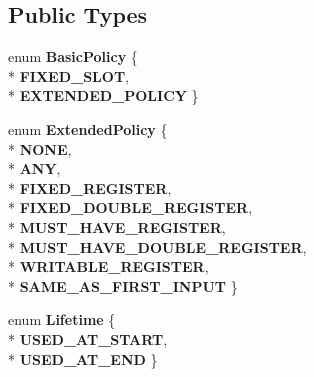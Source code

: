 \subsection*{Public Types}
\begin{DoxyCompactItemize}
\item 
enum {\bfseries Basic\+Policy} \{ \\*
{\bfseries F\+I\+X\+E\+D\+\_\+\+S\+L\+OT}, 
\\*
{\bfseries E\+X\+T\+E\+N\+D\+E\+D\+\_\+\+P\+O\+L\+I\+CY}
 \}\hypertarget{classv8_1_1internal_1_1_l_unallocated_a5c4527b1ada3e5fc5af7ae028910cf65}{}\label{classv8_1_1internal_1_1_l_unallocated_a5c4527b1ada3e5fc5af7ae028910cf65}

\item 
enum {\bfseries Extended\+Policy} \{ \\*
{\bfseries N\+O\+NE}, 
\\*
{\bfseries A\+NY}, 
\\*
{\bfseries F\+I\+X\+E\+D\+\_\+\+R\+E\+G\+I\+S\+T\+ER}, 
\\*
{\bfseries F\+I\+X\+E\+D\+\_\+\+D\+O\+U\+B\+L\+E\+\_\+\+R\+E\+G\+I\+S\+T\+ER}, 
\\*
{\bfseries M\+U\+S\+T\+\_\+\+H\+A\+V\+E\+\_\+\+R\+E\+G\+I\+S\+T\+ER}, 
\\*
{\bfseries M\+U\+S\+T\+\_\+\+H\+A\+V\+E\+\_\+\+D\+O\+U\+B\+L\+E\+\_\+\+R\+E\+G\+I\+S\+T\+ER}, 
\\*
{\bfseries W\+R\+I\+T\+A\+B\+L\+E\+\_\+\+R\+E\+G\+I\+S\+T\+ER}, 
\\*
{\bfseries S\+A\+M\+E\+\_\+\+A\+S\+\_\+\+F\+I\+R\+S\+T\+\_\+\+I\+N\+P\+UT}
 \}\hypertarget{classv8_1_1internal_1_1_l_unallocated_a7f9fb8ddaf57075386c66517aea3fe9c}{}\label{classv8_1_1internal_1_1_l_unallocated_a7f9fb8ddaf57075386c66517aea3fe9c}

\item 
enum {\bfseries Lifetime} \{ \\*
{\bfseries U\+S\+E\+D\+\_\+\+A\+T\+\_\+\+S\+T\+A\+RT}, 
\\*
{\bfseries U\+S\+E\+D\+\_\+\+A\+T\+\_\+\+E\+ND}
 \}\hypertarget{classv8_1_1internal_1_1_l_unallocated_aa0d9c1e73ec74836224460b8693072cd}{}\label{classv8_1_1internal_1_1_l_unallocated_aa0d9c1e73ec74836224460b8693072cd}

\end{DoxyCompactItemize}
